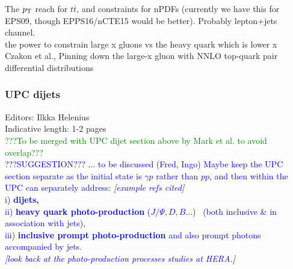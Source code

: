 \documentclass[../report.tex]{subfiles}
\begin{document}
\noindent The $p_{\rm T}$ reach for $t\overline{t}$, and constraints for nPDFs (currently we have this for EPS09, though EPPS16/nCTE15 would be better). Probably lepton+jets channel.
\\
the power to constrain large x gluons vs the heavy quark which is lower x
\\
Czakon et al., Pinning down the large-x gluon with NNLO top-quark pair
                        differential distributions   \cite{Czakon:2016olj}

\subsubsection{UPC dijets}
Editors: Ilkka Helenius\\
Indicative length: 1-2 pages\\
\textcolor{green}{???To be merged with UPC dijet section above by Mark et al. to avoid overlap???}\\
\textcolor{blue}{ ???SUGGESTION??? ... to be discussed (Fred, Ingo) 
Maybe keep the UPC section separate as the initial state is   $\gamma p$ rather than $p p$, and 
then within the UPC can separately address: {\it [example refs cited]}\\ 
i)\textbf{ dijets,} \\
ii) \textbf{heavy quark photo-production }($J/\Psi, D, B ...$)~\cite{Aktas:2005bt} (both inclusive \& in association with jets), \\
iii) \textbf{inclusive prompt photo-production} and also prompt photons accompanied by jets.~\cite{Bussey:2001xg,Chwastowski:2003aw}\\
{\it [look back at the photo-production processes studies at HERA.]}
}
\end{document}
